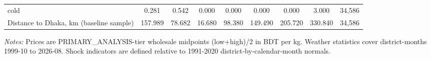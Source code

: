 \begin{table}[htbp]
\begin{tabular}{lcccccccc}
  cold & 0.281 & 0.542 & 0.000 & 0.000 & 0.000 & 0.000 & 3.000 & 34,586 \\
Distance to Dhaka, km (baseline sample) & 157.989 & 78.682 & 16.680 & 98.380 & 149.490 & 205.720 & 330.840 & 34,586 \\
\bottomrule
\end{tabular}
\begin{minipage}{0.95\linewidth}\footnotesize \textit{Notes:} Prices are PRIMARY\_ANALYSIS-tier wholesale midpoints (low+high)/2 in BDT per kg. Weather statistics cover district-months 1999-10 to 2026-08. Shock indicators are defined relative to 1991-2020 district-by-calendar-month normals.\end{minipage}
\end{table}